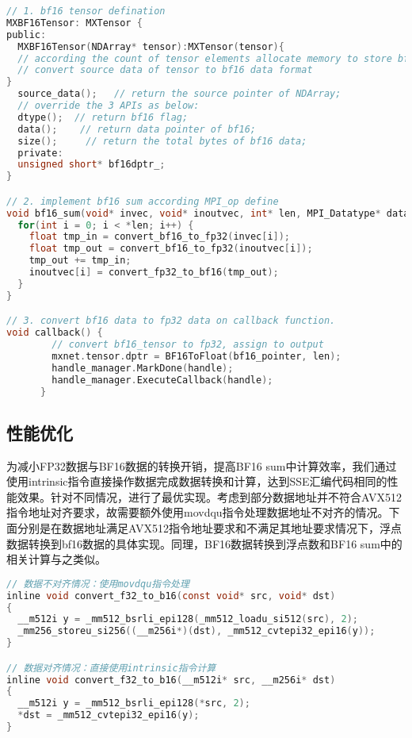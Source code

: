 \begin{lstlisting}[language=C, numbers=none]
// 1. bf16 tensor defination
MXBF16Tensor: MXTensor {
public:
  MXBF16Tensor(NDArray* tensor):MXTensor(tensor){
  // according the count of tensor elements allocate memory to store bf16 data;
  // convert source data of tensor to bf16 data format
}
  source_data();   // return the source pointer of NDArray;
  // override the 3 APIs as below:
  dtype();  // return bf16 flag;
  data();    // return data pointer of bf16;
  size();     // return the total bytes of bf16 data;
  private:
  unsigned short* bf16dptr_;
}

// 2. implement bf16 sum according MPI_op define
void bf16_sum(void* invec, void* inoutvec, int* len, MPI_Datatype* datatype) {
  for(int i = 0; i < *len; i++) {
    float tmp_in = convert_bf16_to_fp32(invec[i]);
    float tmp_out = convert_bf16_to_fp32(inoutvec[i]);
    tmp_out += tmp_in;
    inoutvec[i] = convert_fp32_to_bf16(tmp_out);
  }
}

// 3. convert bf16 data to fp32 data on callback function.
void callback() {
        // convert bf16_tensor to fp32, assign to output
        mxnet.tensor.dptr = BF16ToFloat(bf16_pointer, len);
        handle_manager.MarkDone(handle);
        handle_manager.ExecuteCallback(handle);
      }
\end{lstlisting}

\subsection{性能优化}
为减小FP32数据与BF16数据的转换开销，提高BF16 sum中计算效率，我们通过使用intrinsic指令直接操作数据完成数据转换和计算，达到SSE汇编代码相同的性能效果。针对不同情况，进行了最优实现。考虑到部分数据地址并不符合AVX512指令地址对齐要求，故需要额外使用movdqu指令处理数据地址不对齐的情况。下面分别是在数据地址满足AVX512指令地址要求和不满足其地址要求情况下，浮点数据转换到bf16数据的具体实现。同理，BF16数据转换到浮点数和BF16 sum中的相关计算与之类似。

\begin{lstlisting}[language=C, numbers=none]
// 数据不对齐情况：使用movdqu指令处理
inline void convert_f32_to_b16(const void* src, void* dst)
{
  __m512i y = _mm512_bsrli_epi128(_mm512_loadu_si512(src), 2);
  _mm256_storeu_si256((__m256i*)(dst), _mm512_cvtepi32_epi16(y));
}

// 数据对齐情况：直接使用intrinsic指令计算
inline void convert_f32_to_b16(__m512i* src, __m256i* dst)
{
  __m512i y = _mm512_bsrli_epi128(*src, 2);
  *dst = _mm512_cvtepi32_epi16(y);
}
\end{lstlisting}

